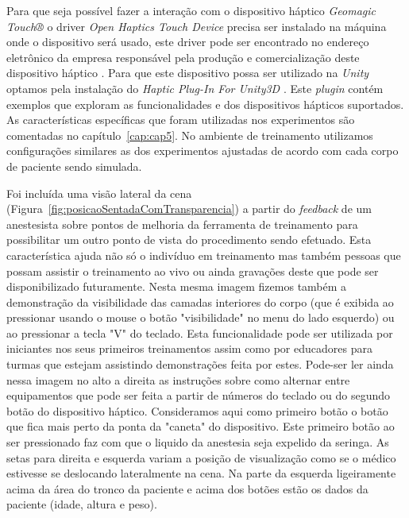 Para que seja possível fazer a interação com o dispositivo háptico \textit{Geomagic Touch®} o driver \textit{Open Haptics Touch Device} precisa ser instalado na máquina onde o dispositivo será usado, este driver pode ser encontrado no endereço eletrônico da empresa responsável pela produção e comercialização deste dispositivo háptico \cite{3DSystemsTouch2018}. Para que este dispositivo possa ser utilizado na \textit{Unity} optamos pela instalação do \textit{Haptic Plug-In For Unity3D} \cite{Poyade2014}. Este \textit{plugin} contém exemplos que exploram as funcionalidades e dos dispositivos hápticos suportados. As características específicas que foram utilizadas nos experimentos são comentadas no capítulo~\ref{cap:cap5}. No ambiente de treinamento utilizamos configurações similares as dos experimentos ajustadas de acordo com cada corpo de paciente sendo simulada. 

Foi incluída uma visão lateral da cena (Figura~\ref{fig:posicaoSentadaComTransparencia}) a partir do \textit{feedback} de um anestesista sobre pontos de melhoria da ferramenta de treinamento para possibilitar um outro ponto de vista do procedimento sendo efetuado. Esta característica ajuda não só o indivíduo em treinamento mas também pessoas que possam assistir o treinamento ao vivo ou ainda gravações deste que pode ser disponibilizado futuramente. Nesta mesma imagem fizemos também a demonstração da visibilidade das camadas interiores do corpo (que é exibida ao pressionar usando o mouse o botão "visibilidade" no menu do lado esquerdo) ou ao pressionar a tecla "V" do teclado. Esta funcionalidade pode ser utilizada por iniciantes nos seus primeiros treinamentos assim como por educadores para turmas que estejam assistindo demonstrações feita por estes. Pode-ser ler ainda nessa imagem no alto a direita as instruções sobre como alternar entre equipamentos que pode ser feita a partir de números do teclado ou do segundo botão do dispositivo háptico. Consideramos aqui como primeiro botão o botão que fica mais perto da ponta da "caneta" do dispositivo. Este primeiro botão ao ser pressionado faz com que o liquido da anestesia seja expelido da seringa. As setas para direita e esquerda variam a posição de visualização como se o médico estivesse se deslocando lateralmente na cena. Na parte da esquerda ligeiramente acima da área do tronco da paciente e acima dos botões estão os dados da paciente (idade, altura e peso). 

